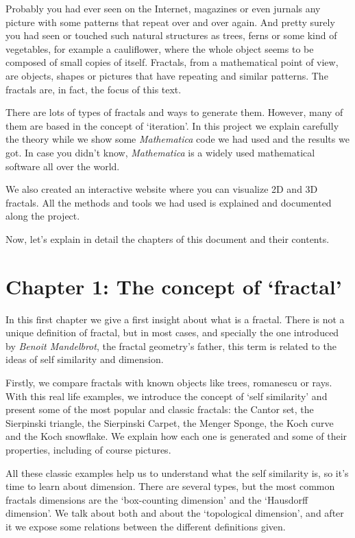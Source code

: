 
Probably you had ever seen on the Internet, magazines or even jurnals any picture with some patterns that repeat over and over again. And pretty surely you had seen or touched such natural structures as trees, ferns or some kind of vegetables, for example a cauliflower, where the whole object seems to be composed of small copies of itself. Fractals, from a mathematical point of view, are objects, shapes or pictures that have repeating and similar patterns. The fractals are, in fact, the focus of this text.

There are lots of types of fractals and ways to generate them. However, many of them are based in the concept of `iteration'. In this project we explain carefully the theory while we show some \textit{Mathematica} code we had used and the results we got. In case you didn't know, \textit{Mathematica} is a widely used mathematical software all over the world. 

We also created an interactive website where you can visualize 2D and 3D fractals. All the methods and tools we had used is explained and documented along the project.

Now, let's explain in detail the chapters of this document and their contents.

\section*{Chapter 1: The concept of `fractal'}

In this first chapter we give a first insight about what is a fractal. There is not a unique definition of fractal, but in most cases, and specially the one introduced by \textit{Benoit Mandelbrot}, the fractal geometry's father, this term is related to the ideas of self similarity and dimension. 

Firstly, we compare fractals with known objects like trees, romanescu or rays. With this real life examples, we introduce the concept of `self similarity' and present some of the most popular and classic fractals: the Cantor set, the Sierpinski triangle, the Sierpinski Carpet, the Menger Sponge, the Koch curve and the Koch snowflake. We explain how each one is generated and some of their properties, including of course pictures.

All these classic examples help us to understand what the self similarity is, so it's time to learn about dimension. There are several types, but the most common fractals dimensions are the `box-counting dimension' and the `Hausdorff dimension'. We talk about both and about the `topological dimension', and after it we expose some relations between the different definitions given.

